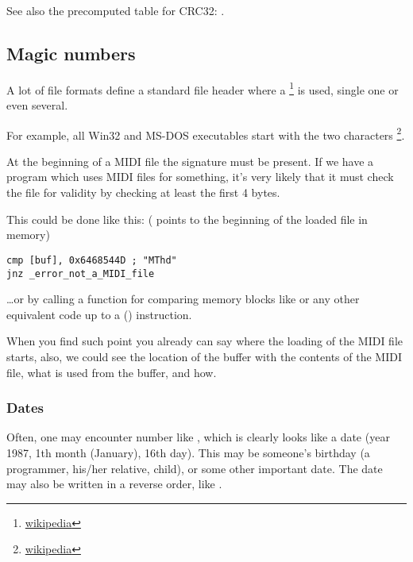 See also the precomputed table for CRC32: .

\subsection{Magic numbers}
\label{magic_numbers}

\newcommand{\FNURLMAGIC}{\footnote{\href{http://go.yurichev.com/17112}{wikipedia}}}

A lot of file formats define a standard file header where a \FNURLMAGIC{} is used, single one or even several.


For example, all Win32 and MS-DOS executables start with the two characters \footnote{\href{http://go.yurichev.com/17113}{wikipedia}}.


At the beginning of a MIDI file the  signature must be present. 
If we have a program which uses MIDI files for something,
it's very likely that it must check the file for validity by checking at least the first 4 bytes.

This could be done like this:
( points to the beginning of the loaded file in memory)

\begin{lstlisting}
cmp [buf], 0x6468544D ; "MThd"
jnz _error_not_a_MIDI_file
\end{lstlisting}


\dots or by calling a function for comparing memory blocks like  or any other equivalent code
up to a  () instruction.

When you find such point you already can say where the loading of the MIDI file starts,
also, we could see the location
of the buffer with the contents of the MIDI file, what is used from the buffer, and how.

\subsubsection{Dates}


Often, one may encounter number like , which is clearly looks like a date (year 1987, 1th month (January), 16th day).
This may be someone's birthday (a programmer, his/her relative, child), or some other important date.
The date may also be written in a reverse order, like .

